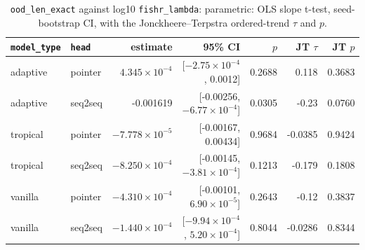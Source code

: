 \documentclass[10pt]{article}
\begin{document}
{\small
\begin{longtable}{llrrrrr}
\caption{\texttt{ood\_len\_exact} against log10 \texttt{fishr\_lambda}: parametric: OLS slope t-test, seed-bootstrap CI, with the Jonckheere--Terpstra ordered-trend $\tau$ and $p$.}\label{tab:trend-ood_len_exact}\\
\toprule
\texttt{model\_type} & \texttt{head} & estimate & 95\% CI & $p$ & JT $\tau$ & JT $p$\\
\midrule
\endhead
adaptive & pointer & $4.345\times10^{-4}$ & [$-2.75\times10^{-4}$, 0.0012] & 0.2688 & 0.118 & 0.3683\\
adaptive & seq2seq & -0.001619 & [-0.00256, $-6.77\times10^{-4}$] & 0.0305 & -0.23 & 0.0760\\
tropical & pointer & $-7.778\times10^{-5}$ & [-0.00167, 0.00434] & 0.9684 & -0.0385 & 0.9424\\
tropical & seq2seq & $-8.250\times10^{-4}$ & [-0.00145, $-3.81\times10^{-4}$] & 0.1213 & -0.179 & 0.1808\\
vanilla & pointer & $-4.310\times10^{-4}$ & [-0.00101, $6.90\times10^{-5}$] & 0.2643 & -0.12 & 0.3837\\
vanilla & seq2seq & $-1.440\times10^{-4}$ & [$-9.94\times10^{-4}$, $5.20\times10^{-4}$] & 0.8044 & -0.0286 & 0.8344\\
\bottomrule
\end{longtable}
}
\end{document}
